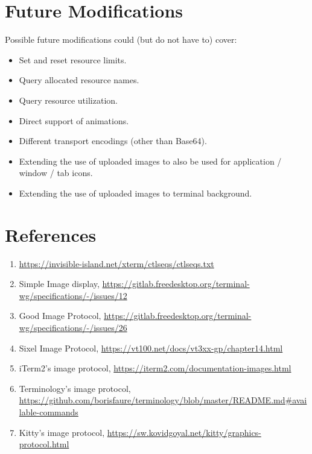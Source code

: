 \documentclass[a4paper]{article}
\begin{document}

\section{Future Modifications} %

Possible future modifications could (but do not have to) cover:

\begin{itemize}
    \item Set and reset resource limits.
    \item Query allocated resource names.
    \item Query resource utilization.
    \item Direct support of animations.
    \item Different transport encodings (other than Base64).
    \item Extending the use of uploaded images to also be used for application / window / tab icons.
    \item Extending the use of uploaded images to terminal background.
\end{itemize}

\section{References} %

\begin{enumerate}
    \item \label{ref:ctlseqs}\url{https://invisible-island.net/xterm/ctlseqs/ctlseqs.txt}
    \item \label{ref:twg-simple-image-display}Simple Image display, \url{https://gitlab.freedesktop.org/terminal-wg/specifications/-/issues/12}
    \item \label{ref:twg-gip}Good Image Protocol, \url{https://gitlab.freedesktop.org/terminal-wg/specifications/-/issues/26}
    \item \label{ref:image-sixel}Sixel Image Protocol, \url{https://vt100.net/docs/vt3xx-gp/chapter14.html}
    \item \label{ref:image-item2}iTerm2's image protocol, \url{https://iterm2.com/documentation-images.html}
    \item \label{ref:image-terminology}Terminology's image protocol, \url{https://github.com/borisfaure/terminology/blob/master/README.md#available-commands}
    \item \label{ref:image-kitty}Kitty's image protocol, \url{https://sw.kovidgoyal.net/kitty/graphics-protocol.html}
\end{enumerate}
\end{document}
